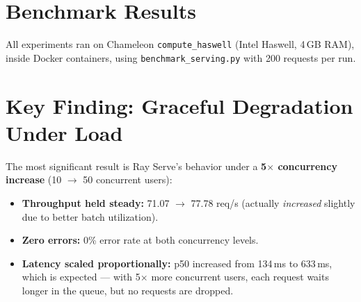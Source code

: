\documentclass[11pt]{article}
\begin{document}
\section{Benchmark Results}

All experiments ran on Chameleon \texttt{compute\_haswell} (Intel Haswell, 4\,GB RAM), inside Docker containers, using \texttt{benchmark\_serving.py} with 200 requests per run.

\begin{table}[h]
\centering
\caption{Ray Serve vs.\ Lab Frameworks --- Performance Comparison}
\label{tab:rayserve_comparison}
\end{table}

\section{Key Finding: Graceful Degradation Under Load}

The most significant result is Ray Serve's behavior under a \textbf{5$\times$ concurrency increase} (10 $\to$ 50 concurrent users):

\begin{itemize}
  \item \textbf{Throughput held steady:} 71.07 $\to$ 77.78 req/s (actually \emph{increased} slightly due to better batch utilization).
  \item \textbf{Zero errors:} 0\% error rate at both concurrency levels.
  \item \textbf{Latency scaled proportionally:} p50 increased from 134\,ms to 633\,ms, which is expected --- with 5$\times$ more concurrent users, each request waits longer in the queue, but no requests are dropped.
\end{itemize}
\end{document}

